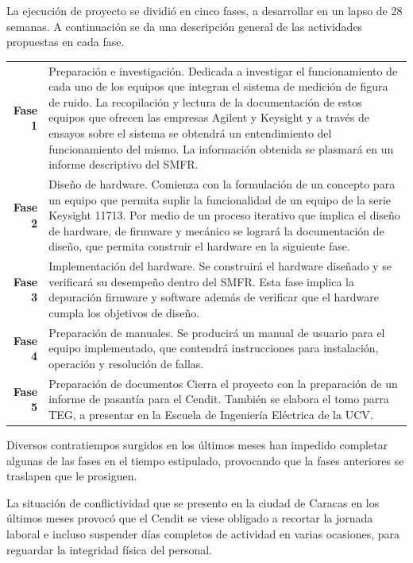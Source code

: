 \documentclass[paper=letter,oneside,fontsize=11pt, parskip=full]{scrartcl}
\begin{document}
	La ejecución de proyecto se dividió en cinco fases, a desarrollar en un lapso de 28 semanas. A continuación se da una descripción general de las actividades propuestas en cada fase.

	\begin{table}[!h]
		\begin{tabular}{rp{13cm}}
			\textbf{Fase 1} & Preparación e investigación. Dedicada a investigar el funcionamiento de cada uno de los equipos que integran el sistema de medición de figura de ruido. La recopilación y lectura de la documentación de estos equipos que ofrecen las empresas Agilent y Keysight y a través de ensayos sobre el sistema se obtendrá un entendimiento del funcionamiento del mismo. La información obtenida se plasmará en un informe descriptivo del SMFR. \\			
			\textbf{Fase 2} & Diseño de hardware. Comienza con la formulación de un concepto para un equipo que permita suplir la funcionalidad de un equipo de la serie Keysight 11713. Por medio de un proceso iterativo que implica el diseño de hardware, de firmware y mecánico se logrará la documentación de diseño, que permita construir el hardware en la siguiente fase.	\\		
			\textbf{Fase 3} & Implementación del hardware. Se construirá el hardware diseñado y se verificará su desempeño dentro del SMFR. Esta fase implica la depuración firmware y software además de verificar que el hardware cumpla los objetivos de diseño. \\
			\textbf{Fase 4} & Preparación de manuales. Se producirá un manual de usuario para el equipo implementado, que contendrá instrucciones para instalación, operación y resolución de fallas. \\
			\textbf{Fase 5} & Preparación de documentos Cierra el proyecto con la preparación de un informe de pasantía para el Cendit. También se elabora el tomo parra TEG, a presentar en la Escuela de Ingeniería Eléctrica de la UCV.
		\end{tabular}
	\end{table}

	Diversos contratiempos surgidos en los últimos meses han impedido completar algunas de las fases en el tiempo estipulado, provocando que la fases anteriores se traslapen que le prosiguen.
	
	La situación de conflictividad que se presento en la ciudad de Caracas en los últimos meses provocó que el Cendit se viese obligado a recortar la jornada laboral e incluso suspender días completos de actividad en varias ocasiones, para reguardar la integridad física del personal.
	
\end{document}
